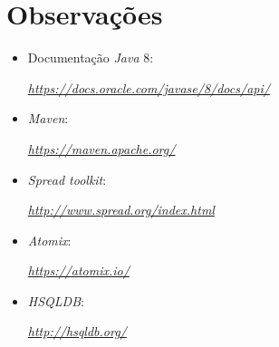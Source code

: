 \documentclass[a4paper]{report}
\begin{document}
\chapter{Observações} \label{ch:Observations}
\begin{itemize}
    \item Documentação \textit{Java} 8:
    \par \textit{\url{https://docs.oracle.com/javase/8/docs/api/}}
	\item \textit{Maven}:
	\par \textit{\url{https://maven.apache.org/}}
	\item \textit{Spread toolkit}:
	\par \textit{\url{http://www.spread.org/index.html}}
	\item \textit{Atomix}:
	\par \textit{\url{https://atomix.io/}}
	\item \textit{HSQLDB}:
	\par \textit{\url{http://hsqldb.org/}}
\end{itemize}
\end{document}

